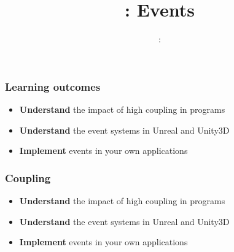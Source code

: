 \usepackage{../../beamerthemeFalmouthGamesAcademy}
\usepackage{multimedia}
\graphicspath{ {../../} }


\usepackage[normalem]{ulem}
\usepackage{wasysym}
\usepackage{listings}
\usepackage{pdfpages}

\usetikzlibrary{arrows,automata}




\title{\sessionnumber: Events}
\subtitle{\modulecode: \moduletitle}

\frame{\titlepage}

\begin{frame}
	\frametitle{Learning outcomes}
	\begin{itemize}
		\item \textbf{Understand} the impact of high coupling in programs
		\item \textbf{Understand} the event systems in Unreal and Unity3D
		\item \textbf{Implement} events in your own applications
	\end{itemize}
\end{frame}

\begin{frame}
	\frametitle{Coupling}
	\begin{itemize}
		\item \textbf{Understand} the impact of high coupling in programs
		\item \textbf{Understand} the event systems in Unreal and Unity3D
		\item \textbf{Implement} events in your own applications
	\end{itemize}
\end{frame}

